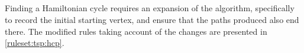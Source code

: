 
\subsection{}
Finding a Hamiltonian cycle requires an expansion of the algorithm, specifically to record the initial starting vertex, and ensure that the paths produced also end there.  The modified rules taking account of the changes are presented in \cref{ruleset:tsp:hcp}.

    
    
        
    
    
    

